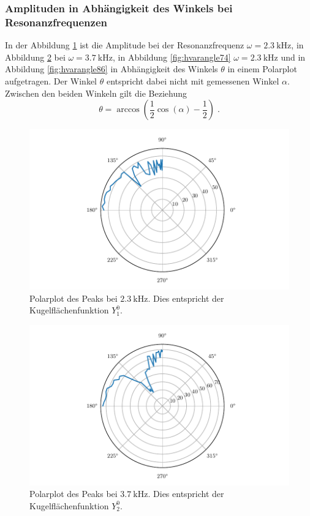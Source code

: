 \subsubsection{Amplituden in Abhängigkeit des Winkels bei Resonanzfrequenzen}
In der Abbildung \ref{fig:hvarangle27} ist die Amplitude bei der Resonanzfrequenz $\omega = \qty{2.3}{\kilo\hertz}$, in Abbildung \ref{fig:hvarangle37} bei
$\omega = \qty{3.7}{\kilo\hertz}$, in Abbildung \ref{fig:hvarangle74} $\omega = \qty{2.3}{\kilo\hertz}$ und in Abbildung \ref{fig:hvarangle86} in Abhängigkeit 
des Winkels $\theta$ in einem Polarplot aufgetragen.
Der Winkel $\theta$ entspricht dabei nicht mit gemessenen Winkel $\alpha$. Zwischen den beiden Winkeln gilt die Beziehung 
\begin{equation}
    \theta = \arccos \left ( \frac{1}{2} \cos \left ( \alpha \right ) - \frac{1}{2} \right) \; {.}
\end{equation}
\begin{figure}
    \centering
    \includegraphics{build/hvarangle27.pdf}
    \caption{Polarplot des Peaks bei $\qty{2.3}{\kilo\hertz}$. Dies entspricht der Kugelflächenfunktion $Y_1^0$.}
    \label{fig:hvarangle27}
\end{figure}
\begin{figure}
    \centering
    \includegraphics{build/hvarangle37.pdf}
    \caption{Polarplot des Peaks bei $\qty{3.7}{\kilo\hertz}$. Dies entspricht der Kugelflächenfunktion $Y_2^0$.}
    \label{fig:hvarangle37}
\end{figure}
